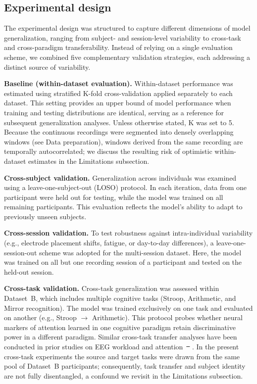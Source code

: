 \documentclass[10pt,letterpaper]{article}
\makeatletter
\newcommand{\rev}[1]{#1} %
\providecommand{\DIFaddtex}[1]{{\protect\color{blue}\uwave{#1}}} %
\providecommand{\DIFdeltex}[1]{{\protect\color{red}\sout{#1}}} %
\providecommand{\DIFaddbegin}{} %
\providecommand{\DIFaddend}{} %
\providecommand{\DIFdelbegin}{} %
\providecommand{\DIFdelend}{} %
\providecommand{\DIFadd}[1]{\texorpdfstring{\DIFaddtex{#1}}{#1}} %
\providecommand{\DIFdel}[1]{\texorpdfstring{\DIFdeltex{#1}}{}} %
\providecommand{\DIFscaledelfig}{0.5}
\newlength{\DIFdelgraphicswidth} %
\newlength{\DIFdelgraphicsheight} %
\providecommand{\DIFaddincludegraphics}[2][]{{\color{blue}\fbox{\DIFOincludegraphics[#1]{#2}}}} %
\providecommand{\DIFdelincludegraphics}[2][]{%
\sbox{\DIFdelgraphicsbox}{\DIFOincludegraphics[#1]{#2}}%
\settoboxwidth{\DIFdelgraphicswidth}{\DIFdelgraphicsbox} %
\settoboxtotalheight{\DIFdelgraphicsheight}{\DIFdelgraphicsbox} %
\scalebox{\DIFscaledelfig}{%
\parbox[b]{\DIFdelgraphicswidth}{\usebox{\DIFdelgraphicsbox}\\[-\baselineskip] \rule{\DIFdelgraphicswidth}{0em}}\llap{\resizebox{\DIFdelgraphicswidth}{\DIFdelgraphicsheight}{%
\setlength{\unitlength}{\DIFdelgraphicswidth}%
\begin{picture}(1,1)%
\thicklines\linethickness{2pt} %
{\color[rgb]{1,0,0}\put(0,0){\framebox(1,1){}}}%
{\color[rgb]{1,0,0}\put(0,0){\line( 1,1){1}}}%
{\color[rgb]{1,0,0}\put(0,1){\line(1,-1){1}}}%
\end{picture}%
}\hspace*{3pt}}} %
} %
\DeclareRobustCommand{\DIFaddbegin}{\DIFOaddbegin \let\includegraphics\DIFaddincludegraphics} %
\DeclareRobustCommand{\DIFaddend}{\DIFOaddend \let\includegraphics\DIFOincludegraphics} %
\DeclareRobustCommand{\DIFdelbegin}{\DIFOdelbegin \let\includegraphics\DIFdelincludegraphics} %
\DeclareRobustCommand{\DIFdelend}{\DIFOaddend \let\includegraphics\DIFOincludegraphics} %
\let\sout@orig\sout %
\renewcommand{\sout}[1]{\ifmmode\text{\sout@orig{\ensuremath{#1}}}\else\sout@orig{#1}\fi} %
\makeatother
\begin{document}
\subsection*{Experimental design}

The experimental design was structured to capture different dimensions of model generalization, ranging from subject- and session-level variability to cross-task and cross-paradigm transferability. Instead of relying on a single evaluation scheme, we combined five complementary validation strategies, each addressing a distinct source of variability.

\textbf{Baseline (within-dataset evaluation).}
Within-dataset performance was estimated using stratified K-fold cross-validation applied separately to each dataset. This setting provides an upper bound of model performance when training and testing distributions are identical, serving as a reference for subsequent generalization analyses. \rev{Unless otherwise stated, K was set to 5. Because the continuous recordings were segmented into densely overlapping windows (see Data preparation), windows derived from the same recording are temporally autocorrelated; we discuss the resulting risk of optimistic within-dataset estimates in the Limitations subsection.}

\textbf{Cross-subject validation.}
Generalization across individuals was examined using a leave-one-subject-out (LOSO) protocol. In each iteration, data from one participant were held out for testing, while the model was trained on all remaining participants. This evaluation reflects the model's ability to adapt to previously unseen subjects.

\textbf{Cross-session validation.}
To test robustness against intra-individual variability (e.g., electrode placement shifts, fatigue, or day-to-day differences), a leave-one-session-out scheme was adopted for the multi-session dataset. Here, the model was trained on all but one recording session of a participant and tested on the held-out session.

\textbf{Cross-task validation.}
Cross-task generalization was assessed within Dataset~B, which includes multiple cognitive tasks (Stroop, Arithmetic, and Mirror recognition). The model was trained exclusively on one task and evaluated on another (e.g., Stroop $\rightarrow$ Arithmetic). This protocol probes whether neural markers of attention learned in one cognitive paradigm retain discriminative power in a different paradigm. Similar cross-task transfer analyses have been conducted in prior studies on EEG workload and attention~\DIFdelbegin \DIFdel{\mbox{%
\cite{zhang2021cross}}\hskip0pt%
}\DIFdelend \DIFaddbegin \DIFadd{\mbox{%
\cite{ke2021crosstask}}\hskip0pt%
}\DIFaddend . \rev{In the present cross-task experiments the source and target tasks were drawn from the same pool of Dataset~B participants; consequently, task transfer and subject identity are not fully disentangled, a confound we revisit in the Limitations subsection.}
\end{document}
